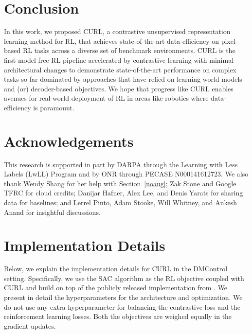 \documentclass{article}
\begin{document}
 
\section{Conclusion}


In this work, we proposed CURL, a contrastive unsupervised representation learning method for RL, that achieves state-of-the-art data-efficiency on pixel-based RL tasks across a diverse set of benchmark environments. CURL is the first model-free RL pipeline accelerated by contrastive learning with minimal architectural changes to demonstrate state-of-the-art performance on complex tasks so far dominated by approaches that have relied on learning world models and (or) decoder-based objectives. We hope that progress like CURL enables avenues for real-world deployment of RL in areas like robotics where data-efficiency is paramount.
\section{Acknowledgements} 


This research is supported in part by DARPA through the Learning with Less Labels (LwLL) Program and by ONR through PECASE N000141612723. We also thank Wendy Shang for her help with Section~\ref{noaug}; Zak Stone and Google TFRC for cloud credits; Danijar Hafner, Alex Lee, and Denis Yarats for sharing data for baselines; and Lerrel Pinto, Adam Stooke, Will Whitney, and Ankesh Anand for insightful discussions. 
 
\newpage



\newpage
\appendix
\section{Implementation Details}
\label{appendix:hyperparams}

Below, we explain the implementation details for CURL in the DMControl setting. Specifically, we use the SAC algorithm as the RL objective coupled with CURL and build on top of the publicly released implementation from \citet{yarats2019improving}. We present in detail the hyperparameters for the architecture and optimization. We do not use any extra hyperparameter for balancing the contrastive loss and the reinforcement learning losses. Both the objectives are weighed equally in the gradient updates.
\end{document}
